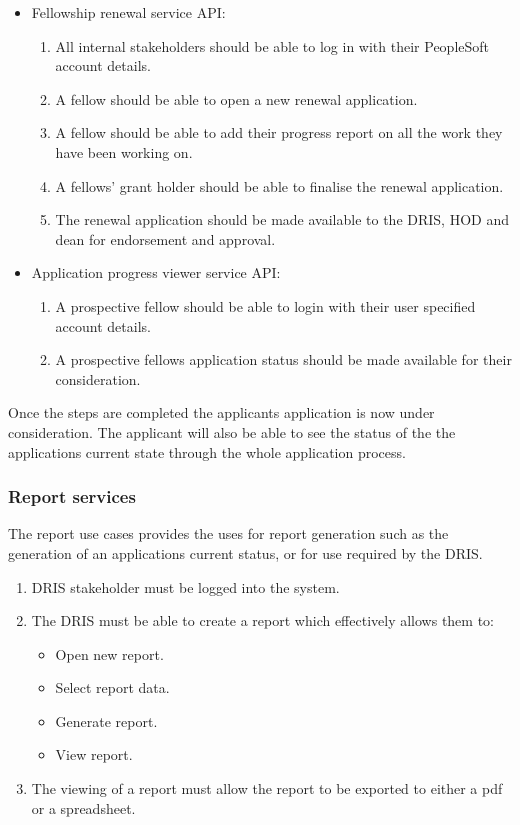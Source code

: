 \documentclass[12pt]{article}
\begin{document}
\begin{itemize}
			\item Fellowship renewal service API:
			\begin{enumerate}		
				\item All internal stakeholders should be able to log in with their PeopleSoft account details.	
				\item A fellow should be able to open a new renewal application. 
				\item A fellow should be able to add their progress report on all the work they have been working on. 
				\item A fellows' grant holder should be able to finalise the renewal application.
				\item The renewal application should be made available to the DRIS, HOD and dean for endorsement and approval.				
			\end{enumerate}
			\item Application progress viewer service API:
			\begin{enumerate}
				\item A prospective fellow should be able to login with their user specified account details.
				\item A prospective fellows application status should be made available for their consideration.			
			\end{enumerate}
		\end{itemize}

Once the steps are completed the applicants application is now under consideration. The applicant will also be able to see the status of the the applications current state through the whole application process.
\subsubsection{Report services}
The report use cases provides the uses for report generation such as the generation of an applications current status, or for use required by the DRIS.
\begin{enumerate}
	\item DRIS stakeholder must be logged into the system.
	\item The DRIS must be able to create a report which effectively allows them to:
	\begin{itemize}
		\item Open new report.
		\item Select report data.
		\item Generate report.
		\item View report.
	\end{itemize}
	\item The viewing of a report must allow the report to be exported to either a pdf or a spreadsheet.
\end{enumerate}
\end{document}
